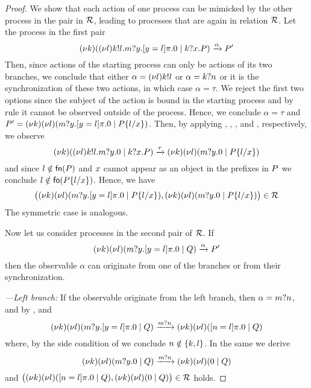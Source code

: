 \begin{proof}
We show that each action of one process can be mimicked by the other process in the pair in $\cal R$, 
leading to 
processes that are again in relation $\cal R$. 
Let the process in the first pair
\[
(\nu k)
( (\nu l)k!l.m?y.[ y = l ]\pi.0 \;|\; k?x.P)\xrightarrow{\alpha} P'
\]
%
Then, since actions of the starting process can only be actions of its two branches,
we conclude that either $\alpha=(\nu l)k!l$ or $\alpha=k?n$ or 
it is the synchronization of these two actions, in which case $\alpha=\tau$. 
We reject the first two options since the subject of the action is bound in the starting process and by 
rule  it cannot be observed outside of the process.
Hence, we conclude $\alpha=\tau$ and $P'=(\nu k) (\nu l)(m?y.[ y = l ]\pi.0 \;|\; P\{l/x\})$. 
Then, by applying , , ,  and , respectively, we observe 
\[
(\nu k)
( (\nu l)k!l.m?y.0 \;|\; k?x.P)
\xrightarrow{\tau} 
(\nu k) (\nu l)(m?y.0 \;|\; P\{l/x\})
\]
%
and since $l\notin\mathsf{fn}(P)$ and $x$ cannot appear as an object 
in the prefixes in $P$ we conclude $l\notin\mathsf{fo}(P\{l/x\})$. 
Hence,  we have 
\[
\big((\nu k) (\nu l)(m?y.[ y = l ]\pi.0 \;|\; P\{l/x\}),
(\nu k) (\nu l)(m?y.0 \;|\; P\{l/x\})\big)\in{\cal R}
\]
The symmetric case is analogous.

Now let us consider processes in the second pair of $\cal R$. 
If 
\[
(\nu k) (\nu l)(m?y.[ y = l ]\pi.0 \;|\; Q)\xrightarrow{\alpha}P'
\]
%
then the observable $\alpha$ can originate from one of the branches or from their synchronization.

\;\emph{---Left branch:}\; 
If the observable originate from the left branch, then $\alpha=m?n$, and by 
,  and   
%
\[
(\nu k) (\nu l)(m?y.[ y = l ]\pi.0 \;|\; Q)
\xrightarrow{m?n} 
(\nu k) (\nu l)([ n = l ]\pi.0 \;|\; Q)
\]
%
where, by the side condition of  we conclude $n\notin\{k, l\}$.
In the same we derive 
%
\[
(\nu k) (\nu l)(m?y.0 \;|\; Q)
\xrightarrow{m?n}
(\nu k) (\nu l)(0 \;|\; Q)
\]
%
and 
$\big((\nu k) (\nu l)([ n = l ]\pi.0 \;|\; Q), 
(\nu k) (\nu l)(0 \;|\; Q)\big)\in{\cal R}$ holds.


\end{proof}
